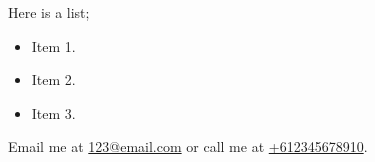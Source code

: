 \documentclass[12pt,busletter,addrfromright,orderfromdateto]{newlfm}
\begin{document}

\begin{newlfm}

	\lipsum[1]
	
	\lipsum[2]
	
	Here is a list;
	\begin{itemize}
		\item Item 1.
		\item Item 2.
		\item Item 3.
	\end{itemize}
	
	\lipsum[3]
	
	Email me at \href{mailto:123@email.com}{123@email.com} or call me at \href{tel:+612345678910}{+612345678910}.
	
	
\end{newlfm}
\end{document}

